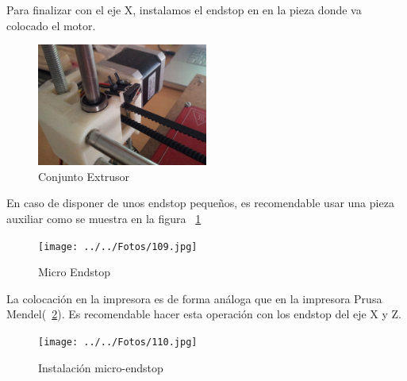 			Para finalizar con el eje X, instalamos el endstop en en la pieza donde va colocado el motor.\\
			\begin{figure}[!htp]
				\centering
				\includegraphics[width=0.5\textwidth]{../../Fotos/66.jpg}
				\caption{Conjunto Extrusor}
			\end{figure}
			En caso de disponer de unos endstop pequeños, es recomendable usar una pieza auxiliar como se muestra en la figura ~\ref{fig:1.ejex}
			\begin{figure}[!htp]
				\centering
				\texttt{[image: ../../Fotos/109.jpg]}
				\caption{Micro Endstop }
				\label{fig:1.ejex}
			\end{figure}
			La colocación en la impresora es de forma análoga que en la impresora Prusa Mendel(~\ref{fig:2.ejex}). Es recomendable hacer esta operación con los endstop del eje X y Z.\\
			\begin{figure}[!htp]
				\centering
				\texttt{[image: ../../Fotos/110.jpg]}
				\caption{Instalación micro-endstop}
				\label{fig:2.ejex}
			\end{figure}